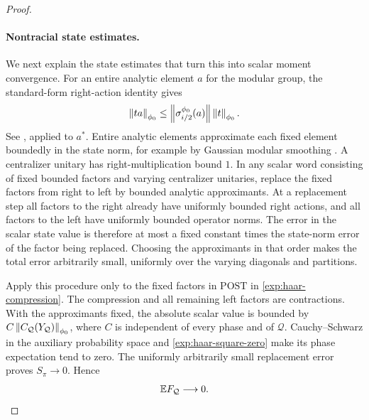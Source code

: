 \begin{proof}
\paragraph{Nontracial state estimates.}
We next explain the state estimates that turn this into scalar moment
convergence. For an entire analytic element $a$ for the modular group,
the standard-form right-action identity gives
\begin{equation}\label{exp:analytic-right}
 \left\lVert ta\right\rVert_{\phi_0}
 \leq\left\lVert\sigma_{i/2}^{\phi_0}(a)\right\rVert\left\lVert t\right\rVert_{\phi_0}.
\end{equation}
See \cite[Lemma~8.12, Equation~(8.4)]{Hiai20}, applied to $a^*$.
Entire analytic elements approximate each fixed element boundedly in
the state norm, for example by Gaussian modular smoothing
\cite[Lemma~2.13]{Hiai20}. A centralizer unitary has right-multiplication bound
$1$. In any scalar word consisting of fixed bounded factors and
varying centralizer unitaries, replace the fixed factors from right to
left by bounded analytic approximants. At a replacement step all
factors to the right already have uniformly bounded right actions,
and all factors to the left have uniformly bounded operator norms.
The error in the scalar state value is therefore at most a fixed
constant times the state-norm error of the factor being replaced.
Choosing the approximants in that order makes the total error
arbitrarily small, uniformly over the varying diagonals and
partitions.

Apply this procedure only to the fixed factors in $\mathrm{POST}$
in \eqref{exp:haar-compression}. The compression and all remaining
left factors are contractions. With the approximants fixed, the
absolute scalar value is bounded by
$C\left\lVert C_{\mathcal Q}(Y_{\mathcal Q})\right\rVert_{\phi_0}$, where $C$ is
independent of every phase and of $\mathcal Q$. Cauchy--Schwarz in
the auxiliary probability space and \eqref{exp:haar-square-zero}
make its phase expectation tend to zero. The uniformly arbitrarily
small replacement error proves $S_\pi\to0$. Hence
\begin{equation}\label{exp:word-expectation-zero}
 \mathbb E F_{\mathcal Q}\longrightarrow0.
\end{equation}


\end{proof}
